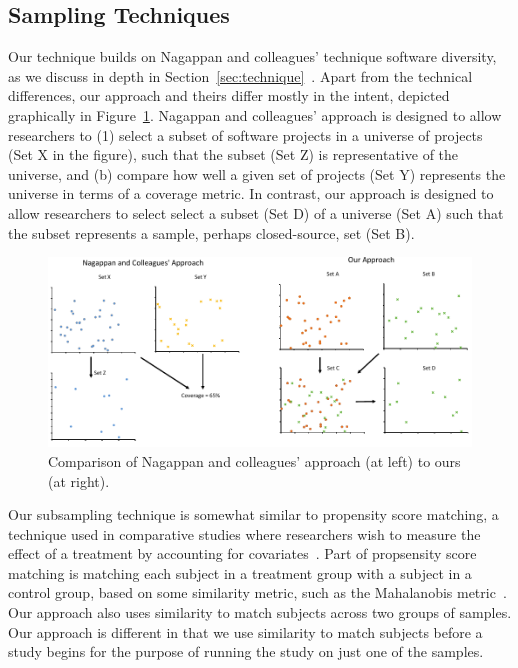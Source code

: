 \documentclass[conference]{IEEEtran}
\begin{document}
\subsection{Sampling Techniques}

Our technique builds on Nagappan and colleagues' technique 
software diversity, as we discuss in depth in 
Section~\ref{sec:technique}~\cite{nagappan2013diversity}.
Apart from the technical differences, our approach and theirs 
differ mostly in the intent, depicted graphically in Figure~\ref{fig:approachCompare}.
Nagappan and colleagues' approach is designed to allow researchers to
(1) select a subset of software projects in a universe of projects (Set X in the figure),
such that the subset  (Set Z) is representative of the universe,
and (b) compare how well a given set of projects (Set Y) represents
the universe in terms of a coverage metric.
In contrast, our approach is designed to allow researchers to 
select select a subset (Set D) of a universe (Set A) such that the subset represents
a sample, perhaps closed-source, set (Set B).


\begin{figure}[ht]
\centering
\includegraphics[width=\textwidth]{figures/ApproachComparisonGraphs.pdf}
\caption{Comparison of Nagappan and colleagues' approach (at left) to ours (at right).}
\label{fig:approachCompare}
\end{figure}

Our subsampling technique is somewhat similar to 
propensity score matching,
a technique used in comparative studies where researchers wish to 
measure the effect of a treatment by accounting for covariates~\cite{rosenbaum1983central}.
Part of propsensity score matching is matching each subject in a treatment 
group with a subject in a control group, based on some similarity metric,
such as the Mahalanobis metric~\cite{mahalanobis1936generalized}.
Our approach also uses similarity to match subjects across two groups of samples.
Our approach is different in that we use similarity to match subjects before
a study begins for the purpose of running the study on just one of the samples.
\end{document}
